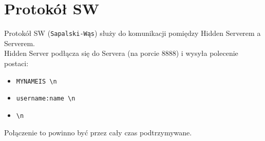 \documentclass[a4paper,notitlepage]{article}
\begin{document}
\pagestyle{fancy}
\tableofcontents
\section{Protokół SW}
Protokół SW (\texttt{Sapalski-Wąs}) służy do komunikacji pomiędzy Hidden Serverem a Serverem. \\
Hidden Server podłącza się do Servera (na porcie 8888) i wysyła polecenie postaci:
\begin{itemize}
    \item \texttt{MYNAMEIS \textbackslash n}
    \item \texttt{username:name \textbackslash n}
    \item \texttt{\textbackslash n}
\end{itemize}
Połączenie to powinno być przez cały czas podtrzymywane.\\
\end{document}
